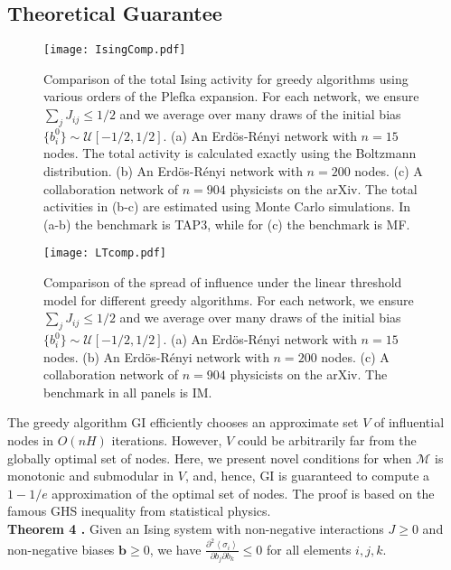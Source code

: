 \documentclass[letterpaper]{article} %
\begin{document}
\subsection{Theoretical Guarantee}

\begin{figure*}[t]
\centering
\texttt{[image: IsingComp.pdf]}
\caption{\label{IsingComp} Comparison of the total Ising activity for greedy algorithms using various orders of the Plefka expansion. For each network, we ensure $\sum_j J_{ij} \le 1/2$ and we average over many draws of the initial bias $\{b_i^0\}\sim \mathcal{U}[-1/2,1/2]$. (a) An Erd\"{o}s-R\'{e}nyi network with $n=15$ nodes. The total activity is calculated exactly using the Boltzmann distribution. (b) An Erd\"{o}s-R\'{e}nyi network with $n=200$ nodes. (c) A collaboration network of $n=904$ physicists on the arXiv. The total activities in (b-c) are estimated using Monte Carlo simulations. In (a-b) the benchmark is TAP3, while for (c) the benchmark is MF.}
\end{figure*}

\begin{figure*}[t]
\centering
\texttt{[image: LTcomp.pdf]}
\caption{\label{LTcomp} Comparison of the spread of influence under the linear threshold model for different greedy algorithms. For each network, we ensure $\sum_j J_{ij} \le 1/2$ and we average over many draws of the initial bias $\{b_i^0\}\sim \mathcal{U}[-1/2,1/2]$. (a) An Erd\"{o}s-R\'{e}nyi network with $n=15$ nodes. (b) An Erd\"{o}s-R\'{e}nyi network with $n=200$ nodes. (c) A collaboration network of $n=904$ physicists on the arXiv. The benchmark in all panels is IM.}
\end{figure*}

The greedy algorithm GI efficiently chooses an approximate set $V$ of influential nodes in $O(nH)$ iterations. However, $V$ could be arbitrarily far from the globally optimal set of nodes. Here, we present novel conditions for when $\mathcal{M}$ is monotonic and submodular in $V$, and, hence, GI is guaranteed to compute a $1-1/e$ approximation of the optimal set of nodes. The proof is based on the famous GHS inequality from statistical physics. \\

\noindent \textbf{Theorem 4 \cite{Griffiths-02}.} Given an Ising system with non-negative interactions $J\ge0$ and non-negative biases $\bm{b}\ge 0$, we have $\frac{\partial^2 \left<\sigma_i\right>}{\partial b_j\partial b_k} \le 0$ for all elements $i,j,k$. \\
\end{document}
